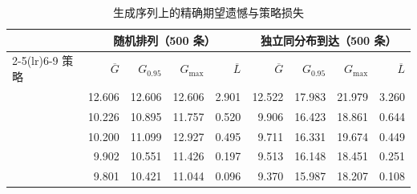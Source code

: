 \begin{table}[htbp]
\centering\small
\caption{生成序列上的精确期望遗憾与策略损失}\label{tab:random}
\begin{tabular}{lrrrrrrrr}
\toprule
 & \multicolumn{4}{c}{随机排列（500 条）} & \multicolumn{4}{c}{独立同分布到达（500 条）} \\
\cmidrule(lr){2-5}\cmidrule(lr){6-9}
策略 & $\overline G$ & $G_{0.95}$ & $G_{\max}$ & $\overline L$ & $\overline G$ & $G_{0.95}$ & $G_{\max}$ & $\overline L$ \\
\midrule
\AlgOne{} & 12.606 & 12.606 & 12.606 & 2.901 & 12.522 & 17.983 & 21.979 & 3.260 \\
\Greedy{} & 10.226 & 10.895 & 11.757 & 0.520 & 9.906 & 16.423 & 18.861 & 0.644 \\
\LPFD{} & 10.200 & 11.099 & 12.927 & 0.495 & 9.711 & 16.331 & 19.674 & 0.449 \\
\LPDual{} & 9.902 & 10.551 & 11.426 & 0.197 & 9.513 & 16.148 & 18.451 & 0.251 \\
\IIDDP{} & 9.801 & 10.421 & 11.044 & 0.096 & 9.370 & 15.987 & 18.207 & 0.108 \\
\bottomrule
\end{tabular}
\par{}
\end{table}
